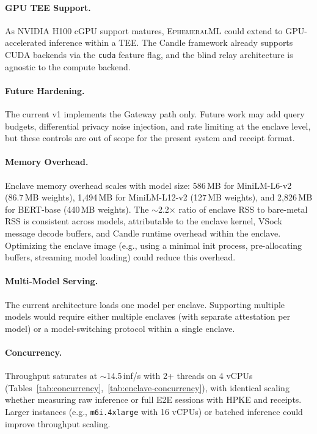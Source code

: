 \documentclass[11pt,a4paper]{article}
\newcommand{\BenchModelName}{MiniLM-L6-v2}
\newcommand{\BenchEnclavePeakRssMb}{586}
\begin{document}
\paragraph{GPU TEE Support.}
As NVIDIA H100 cGPU support matures, \textsc{EphemeralML} could extend to GPU-accelerated inference within a TEE.
The Candle framework already supports CUDA backends via the \texttt{cuda} feature flag, and the blind relay architecture is agnostic to the compute backend.

\paragraph{Future Hardening.}
The current v1 implements the Gateway path only. Future work may add query budgets, differential privacy noise injection, and rate limiting at the enclave level, but these controls are out of scope for the present system and receipt format.

\paragraph{Memory Overhead.}
Enclave memory overhead scales with model size: \BenchEnclavePeakRssMb{}\,MB for \BenchModelName{} (86.7\,MB weights), 1{,}494\,MB for MiniLM-L12-v2 (127\,MB weights), and 2{,}826\,MB for BERT-base (440\,MB weights).
The $\sim$2.2$\times$ ratio of enclave RSS to bare-metal RSS is consistent across models, attributable to the enclave kernel, VSock message decode buffers, and Candle runtime overhead within the enclave.
Optimizing the enclave image (e.g., using a minimal init process, pre-allocating buffers, streaming model loading) could reduce this overhead.

\paragraph{Multi-Model Serving.}
The current architecture loads one model per enclave.
Supporting multiple models would require either multiple enclaves (with separate attestation per model) or a model-switching protocol within a single enclave.

\paragraph{Concurrency.}
Throughput saturates at $\sim$14.5\,inf/s with 2+ threads on 4 vCPUs (Tables~\ref{tab:concurrency},~\ref{tab:enclave-concurrency}), with identical scaling whether measuring raw inference or full E2E sessions with HPKE and receipts.
Larger instances (e.g., \texttt{m6i.4xlarge} with 16 vCPUs) or batched inference could improve throughput scaling.
\end{document}
